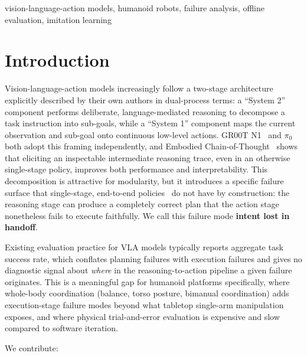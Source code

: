 \documentclass[conference]{IEEEtran}
\begin{document}
\begin{IEEEkeywords}
vision-language-action models, humanoid robots, failure analysis, offline evaluation, imitation learning
\end{IEEEkeywords}

\section{Introduction}

Vision-language-action models increasingly follow a two-stage architecture explicitly
described by their own authors in dual-process terms: a ``System 2'' component performs
deliberate, language-mediated reasoning to decompose a task instruction into sub-goals,
while a ``System 1'' component maps the current observation and sub-goal onto continuous
low-level actions. GR00T N1~\cite{bjorck2025groot} and $\pi_0$~\cite{black2024pi0} both
adopt this framing independently, and Embodied Chain-of-Thought~\cite{zawalski2024ecot}
shows that eliciting an inspectable intermediate reasoning trace, even in an otherwise
single-stage policy, improves both performance and interpretability. This decomposition
is attractive for modularity, but it introduces a specific failure surface that
single-stage, end-to-end policies~\cite{kim2024openvla,brohan2023rt2} do not have by
construction: the reasoning stage can produce a completely correct plan that the action
stage nonetheless fails to execute faithfully. We call this failure mode
\textbf{intent lost in handoff}.

Existing evaluation practice for VLA models typically reports aggregate task success
rate, which conflates planning failures with execution failures and gives no diagnostic
signal about \emph{where} in the reasoning-to-action pipeline a given failure originates.
This is a meaningful gap for humanoid platforms specifically, where whole-body
coordination (balance, torso posture, bimanual coordination) adds execution-stage failure
modes beyond what tabletop single-arm manipulation exposes, and where physical
trial-and-error evaluation is expensive and slow compared to software iteration.

We contribute:
\end{document}
